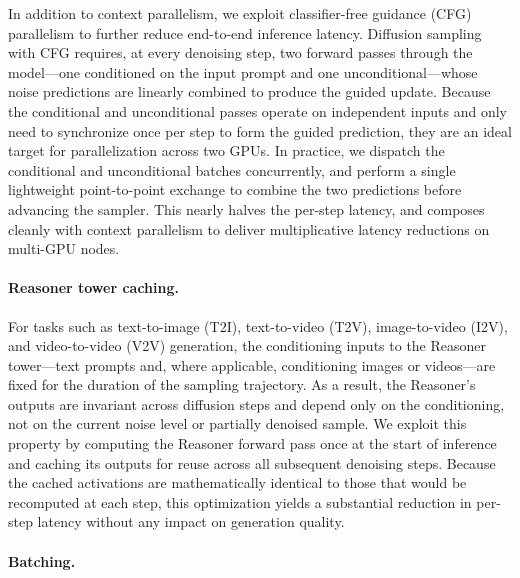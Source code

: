 In addition to context parallelism, we exploit classifier-free guidance (CFG) parallelism to further reduce end-to-end inference latency. Diffusion sampling with CFG requires, at every denoising step, two forward passes through the model---one conditioned on the input prompt and one unconditional---whose noise predictions are linearly combined to produce the guided update. Because the conditional and unconditional passes operate on independent inputs and only need to synchronize once per step to form the guided prediction, they are an ideal target for parallelization across two GPUs. In practice, we dispatch the conditional and unconditional batches concurrently, and perform a single lightweight point-to-point exchange to combine the two predictions before advancing the sampler. This nearly halves the per-step latency, and composes cleanly with context parallelism to deliver multiplicative latency reductions on multi-GPU nodes.

\paragraph{Reasoner tower caching.}

For tasks such as text-to-image (T2I), text-to-video (T2V), image-to-video (I2V), and video-to-video (V2V) generation, the conditioning inputs to the Reasoner tower---text prompts and, where applicable, conditioning images or videos---are fixed for the duration of the sampling trajectory. As a result, the Reasoner's outputs are invariant across diffusion steps and depend only on the conditioning, not on the current noise level or partially denoised sample. We exploit this property by computing the Reasoner forward pass once at the start of inference and caching its outputs for reuse across all subsequent denoising steps. Because the cached activations are mathematically identical to those that would be recomputed at each step, this optimization yields a substantial reduction in per-step latency without any impact on generation quality.

\paragraph{Batching.}


